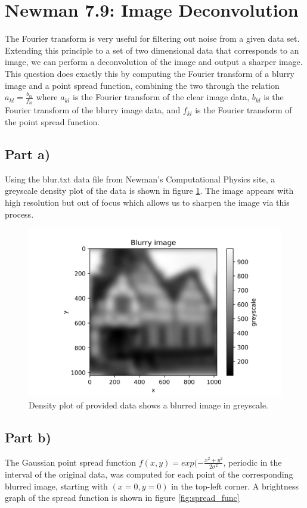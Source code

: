 \documentclass{article}
\begin{document}
\section{Newman 7.9: Image Deconvolution}
The Fourier transform is very useful for filtering out noise from a given data set. Extending this principle to a set of two dimensional data that corresponds to an image, we can perform a deconvolution of the image and output a sharper image. This question does exactly this by computing the Fourier transform of a blurry image and a point spread function, combining the two through the relation $a_{kl} = \frac{b_{kl}}{f_{kl}}$ where $a_{kl}$ is the Fourier transform of the clear image data, $b_{kl}$ is the Fourier transform of the blurry image data, and $f_{kl}$ is the Fourier transform of the point spread function.

\subsection{Part a)}
Using the blur.txt data file from Newman's Computational Physics site, a greyscale density plot of the data is shown in figure \ref{fig:blurred_image}. The image appears with high resolution but out of focus which allows us to sharpen the image via this process.

\begin{figure}[H]
	\centering
	\includegraphics{../images/blurred_image.png}
	\caption{Density plot of provided data shows a blurred image in greyscale.}
	\label{fig:blurred_image}	
\end{figure}

\subsection{Part b)}
The Gaussian point spread function $f(x,y) = exp(-\frac{x^2+y^2}{2\sigma^2}$, periodic in the interval of the original data, was computed for each point of the corresponding blurred image, starting with $(x=0,y=0)$ in the top-left corner. A brightness graph of the spread function is shown in figure \ref{fig:spread_func}
\end{document}
